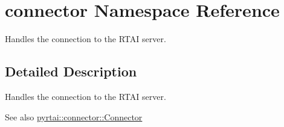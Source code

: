 \hypertarget{namespaceconnector}{
\section{connector \-Namespace \-Reference}
\label{namespaceconnector}
}


\-Handles the connection to the \-R\-T\-A\-I server.  




\subsection{\-Detailed \-Description}
\-Handles the connection to the \-R\-T\-A\-I server. \begin{DoxySeeAlso}{\-See also}
\hyperlink{classpyrtai_1_1connector_1_1_connector}{pyrtai\-::connector\-::\-Connector} 
\end{DoxySeeAlso}
